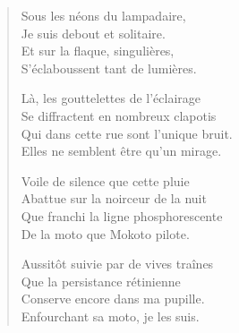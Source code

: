 \begin{verse}\quatrain
  Sous les néons du lampadaire,\\  %
  Je suis debout et solitaire.\\  %
  Et sur la flaque, singulières,\\  %
  S’éclaboussent tant de lumières.

  Là, les gouttelettes de l’éclairage\\  %
  Se diffractent en nombreux clapotis \\  %
  Qui dans cette rue sont l’unique bruit.\\  %
  Elles ne semblent être qu’un mirage.

  Voile de silence que cette pluie\\  %
  Abattue sur la noirceur de la nuit\\  %
  Que franchi la ligne phosphorescente\\  %
  De la moto que Mokoto pilote.

  Aussitôt suivie par de vives traînes\\  %
  Que la persistance rétinienne\\  %
  Conserve encore dans ma pupille.\\  %
  Enfourchant sa moto, je les suis.
\end{verse}


